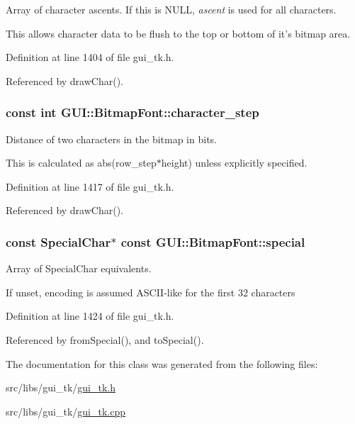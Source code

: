Array of character ascents. If this is N\-U\-L\-L, {\itshape ascent\/} is used for all characters. 

This allows character data to be flush to the top or bottom of it's bitmap area. 

Definition at line 1404 of file gui\-\_\-tk.\-h.



Referenced by draw\-Char().

\hypertarget{classGUI_1_1BitmapFont_a27146558fd76b2ac1c2dc7133b23f4ce}{
\subsubsection[{character\-\_\-step}]{\setlength{\rightskip}{0pt plus 5cm}const int {\bf G\-U\-I\-::\-Bitmap\-Font\-::character\-\_\-step}}}\label{classGUI_1_1BitmapFont_a27146558fd76b2ac1c2dc7133b23f4ce}


Distance of two characters in the bitmap in bits. 

This is calculated as abs(row\-\_\-step$\ast$height) unless explicitly specified. 

Definition at line 1417 of file gui\-\_\-tk.\-h.



Referenced by draw\-Char().

\hypertarget{classGUI_1_1BitmapFont_a46f912c496e902dfc614e25261599718}{
\subsubsection[{special}]{\setlength{\rightskip}{0pt plus 5cm}const {\bf Special\-Char}$\ast$ const {\bf G\-U\-I\-::\-Bitmap\-Font\-::special}}}\label{classGUI_1_1BitmapFont_a46f912c496e902dfc614e25261599718}


Array of Special\-Char equivalents. 

If unset, encoding is assumed A\-S\-C\-I\-I-\/like for the first 32 characters 

Definition at line 1424 of file gui\-\_\-tk.\-h.



Referenced by from\-Special(), and to\-Special().



The documentation for this class was generated from the following files\-:\begin{DoxyCompactItemize}
\item 
src/libs/gui\-\_\-tk/\hyperlink{gui__tk_8h}{gui\-\_\-tk.\-h}\item 
src/libs/gui\-\_\-tk/\hyperlink{gui__tk_8cpp}{gui\-\_\-tk.\-cpp}\end{DoxyCompactItemize}
